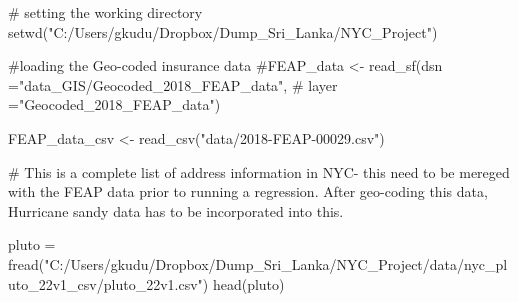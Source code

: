 \documentclass[
  letterpaper,
  DIV=11,
  numbers=noendperiod]{scrartcl}
\newenvironment{Shaded}{\begin{snugshade}}{\end{snugshade}}
\newcommand{\CommentTok}[1]{\textcolor[rgb]{0.37,0.37,0.37}{#1}}
\newcommand{\FunctionTok}[1]{\textcolor[rgb]{0.28,0.35,0.67}{#1}}
\newcommand{\NormalTok}[1]{\textcolor[rgb]{0.00,0.23,0.31}{#1}}
\newcommand{\OtherTok}[1]{\textcolor[rgb]{0.00,0.23,0.31}{#1}}
\newcommand{\StringTok}[1]{\textcolor[rgb]{0.13,0.47,0.30}{#1}}
\begin{document}
\begin{Shaded}
\begin{Highlighting}[]
\CommentTok{\# setting the working directory }
\FunctionTok{setwd}\NormalTok{(}\StringTok{"C:/Users/gkudu/Dropbox/Dump\_Sri\_Lanka/NYC\_Project"}\NormalTok{)}

\CommentTok{\#loading the Geo{-}coded insurance data}
\CommentTok{\#FEAP\_data \textless{}{-} read\_sf(dsn ="data\_GIS/Geocoded\_2018\_FEAP\_data",}
                    \CommentTok{\# layer ="Geocoded\_2018\_FEAP\_data")}

\NormalTok{FEAP\_data\_csv }\OtherTok{\textless{}{-}} \FunctionTok{read\_csv}\NormalTok{(}\StringTok{"data/2018{-}FEAP{-}00029.csv"}\NormalTok{)}
\end{Highlighting}
\end{Shaded}

\begin{Shaded}
\begin{Highlighting}[]
\CommentTok{\# This is a complete list of address information in NYC{-} this need to be mereged with the FEAP data prior to running a regression. After geo{-}coding this data, Hurricane sandy data has to be incorporated into this. }

\NormalTok{pluto }\OtherTok{=} \FunctionTok{fread}\NormalTok{(}\StringTok{"C:/Users/gkudu/Dropbox/Dump\_Sri\_Lanka/NYC\_Project/data/nyc\_pluto\_22v1\_csv/pluto\_22v1.csv"}\NormalTok{)}
\FunctionTok{head}\NormalTok{(pluto)}
\end{Highlighting}
\end{Shaded}
\end{document}
